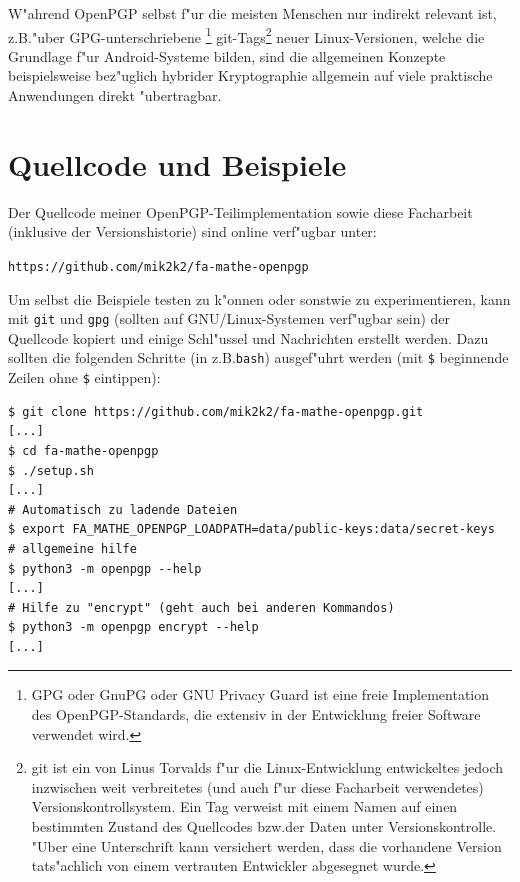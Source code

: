 \documentclass[12pt]{article}
\begin{document}
W"ahrend OpenPGP selbst f"ur die meisten Menschen nur indirekt relevant ist,
z.B.\@ "uber GPG-unterschriebene%
\footnote{GPG oder GnuPG oder GNU Privacy Guard ist eine freie Implementation des OpenPGP-Standards,
die extensiv in der Entwicklung freier Software verwendet wird.}
git-Tags\footnote{git ist ein von Linus Torvalds f"ur die Linux-Entwicklung entwickeltes jedoch inzwischen weit verbreitetes
(und auch f"ur diese Facharbeit verwendetes) Versionskontrollsystem.
Ein Tag verweist mit einem Namen auf einen bestimmten Zustand des Quellcodes bzw.\@ der Daten unter Versionskontrolle.
"Uber eine Unterschrift kann versichert werden, dass die vorhandene Version tats"achlich von einem vertrauten Entwickler abgesegnet wurde.} neuer Linux-Versionen, welche die Grundlage f"ur Android-Systeme bilden,
sind die allgemeinen Konzepte beispielsweise be\-z"ug\-lich hybrider Kryptographie allgemein
auf viele praktische Anwendungen direkt "ubertragbar.

\newpage
\appendix



\section{Quellcode und Beispiele}
%
%
%
%
%
%
%
%
%
%

Der Quellcode meiner OpenPGP-Teilimplementation sowie diese Facharbeit (inklusive der Versionshistorie) sind
online verf"ugbar unter:
\begin{center}\texttt{https://github.com/mik2k2/fa-mathe-openpgp}\end{center}

Um selbst die Beispiele testen zu k"onnen oder sonstwie zu experimentieren, kann mit \texttt{git} und \texttt{gpg}
(sollten auf GNU/Linux-Systemen verf"ugbar sein) der Quellcode kopiert und einige Schl"ussel und Nachrichten erstellt werden.
Dazu sollten die folgenden Schritte (in z.B.\@ \texttt{bash}) ausgef"uhrt werden (mit \verb|$| beginnende Zeilen ohne \verb|$| eintippen):

\begin{verbatim}
$ git clone https://github.com/mik2k2/fa-mathe-openpgp.git
[...]
$ cd fa-mathe-openpgp
$ ./setup.sh
[...]
# Automatisch zu ladende Dateien
$ export FA_MATHE_OPENPGP_LOADPATH=data/public-keys:data/secret-keys
# allgemeine hilfe
$ python3 -m openpgp --help
[...]
# Hilfe zu "encrypt" (geht auch bei anderen Kommandos)
$ python3 -m openpgp encrypt --help
[...]
\end{verbatim}
\end{document}
